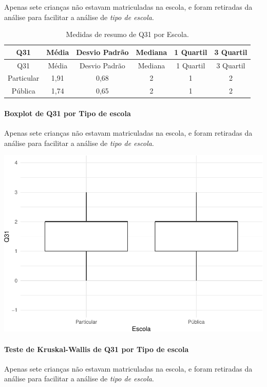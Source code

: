 \documentclass[]{article}
\let\oldparagraph\paragraph
\renewcommand{\paragraph}[1]{\oldparagraph{#1}\mbox{}}
\begin{document}
Apenas sete crianças não estavam matriculadas na escola, e foram retiradas da análise para facilitar a análise de \emph{tipo de escola}.

\begin{longtable}[]{@{}cccccc@{}}
\caption{\label{tab:unnamed-chunk-1060}Medidas de resumo de Q31 por Escola.}\tabularnewline
\toprule
Q31 & Média & Desvio Padrão & Mediana & 1 Quartil & 3 Quartil\tabularnewline
\midrule
\endfirsthead
\toprule
Q31 & Média & Desvio Padrão & Mediana & 1 Quartil & 3 Quartil\tabularnewline
\midrule
\endhead
Particular & 1,91 & 0,68 & 2 & 1 & 2\tabularnewline
Pública & 1,74 & 0,65 & 2 & 1 & 2\tabularnewline
\bottomrule
\end{longtable}

\hypertarget{boxplot-de-q31-por-tipo-de-escola}{%
\paragraph{Boxplot de Q31 por Tipo de escola}\label{boxplot-de-q31-por-tipo-de-escola}}

Apenas sete crianças não estavam matriculadas na escola, e foram retiradas da análise para facilitar a análise de \emph{tipo de escola}.

\begin{center}\includegraphics[width=0.75\linewidth]{relatorio_covid19_files/figure-latex/unnamed-chunk-1061-1} \end{center}

\hypertarget{teste-de-kruskal-wallis-de-q31-por-tipo-de-escola}{%
\paragraph{Teste de Kruskal-Wallis de Q31 por Tipo de escola}\label{teste-de-kruskal-wallis-de-q31-por-tipo-de-escola}}

Apenas sete crianças não estavam matriculadas na escola, e foram retiradas da análise para facilitar a análise de \emph{tipo de escola}.
\end{document}
